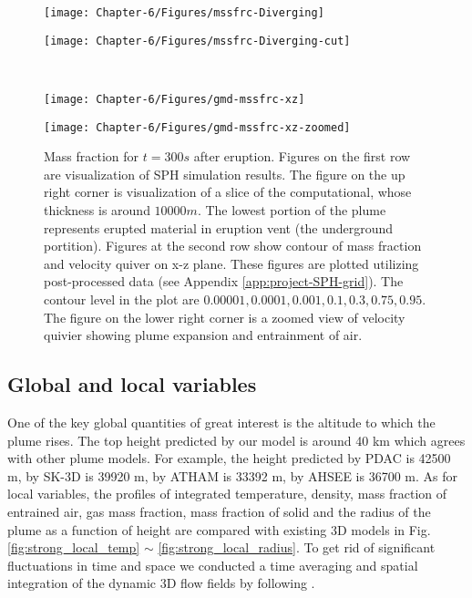 \begin{figure}[!htb]
    \centering
    \begin{minipage}{.45\textwidth}
        \centering
        \texttt{[image: Chapter-6/Figures/mssfrc-Diverging]}
    \end{minipage}%
    \begin{minipage}{.45 \textwidth}
        \centering
        \texttt{[image: Chapter-6/Figures/mssfrc-Diverging-cut]}
    \end{minipage}%
    \\
    \begin{minipage}{.45 \textwidth}
        \centering
        \texttt{[image: Chapter-6/Figures/gmd-mssfrc-xz]}
    \end{minipage}%
    \begin{minipage}{.45 \textwidth}
        \centering
        \texttt{[image: Chapter-6/Figures/gmd-mssfrc-xz-zoomed]}
    \end{minipage}%
    \caption{Mass fraction for $t=300s$ after eruption. Figures on the first row are visualization of SPH simulation results. The figure on the up right corner is visualization of a slice of the computational, whose thickness is around $10000m$. The lowest portion of the plume represents erupted material in eruption vent (the underground portition). Figures at the second row show contour of mass fraction and velocity quiver on x-z plane. These figures are plotted utilizing post-processed data (see Appendix \ref{app:project-SPH-grid}). The contour level in the plot are $0.00001, 0.0001, 0.001, 0.1, 0.3, 0.75, 0.95$. The figure on the lower right corner is a zoomed view of velocity quivier showing plume expansion and entrainment of air.}
    \label{fig:pinatubo-simulation-results-vis}
\end{figure}

\subsection{Global and local variables}
One of the key global quantities of great interest is the altitude to which the plume rises. The top height predicted by our model is around 40 km which agrees with other plume models. For example, the height predicted by PDAC is 42500 m, by SK-3D is 39920 m, by ATHAM is 33392 m, by AHSEE is 36700 m. As for local variables, the profiles of integrated temperature, density, mass fraction of entrained air, gas mass fraction, mass fraction of solid and the radius of the plume as a function of height are compared with existing 3D models in Fig. \ref{fig:strong_local_temp} $\sim$ \ref{fig:strong_local_radius}. To get rid of significant fluctuations in time and space we conducted a time averaging and spatial integration of the dynamic 3D flow fields by following \citet {cerminara2016large}.

